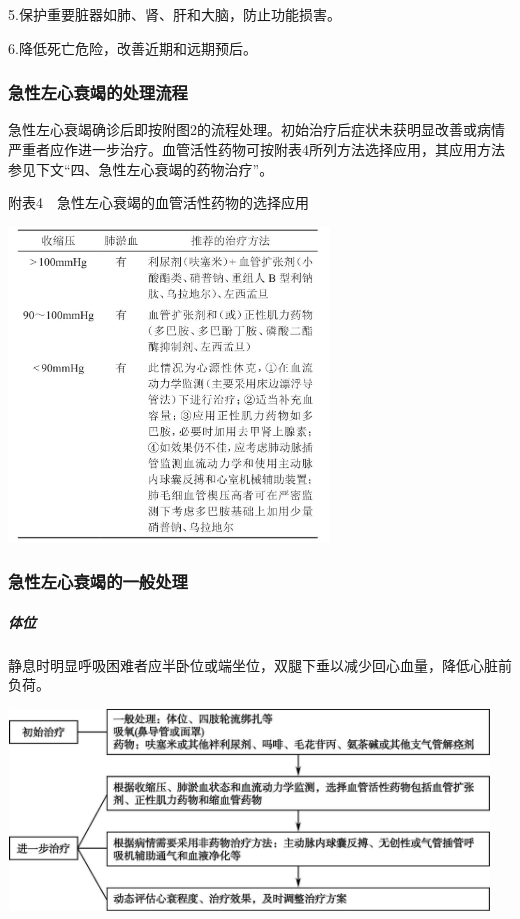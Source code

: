 5.保护重要脏器如肺、肾、肝和大脑，防止功能损害。

6.降低死亡危险，改善近期和远期预后。

\subsubsection{急性左心衰竭的处理流程}

急性左心衰竭确诊后即按附图2的流程处理。初始治疗后症状未获明显改善或病情严重者应作进一步治疗。血管活性药物可按附表4所列方法选择应用，其应用方法参见下文“四、急性左心衰竭的药物治疗”。

附表4　急性左心衰竭的血管活性药物的选择应用

\includegraphics[width=3.35417in,height=3.29167in]{./images/Image00110.jpg}

\subsubsection{急性左心衰竭的一般处理}

\subparagraph{体位}

静息时明显呼吸困难者应半卧位或端坐位，双腿下垂以减少回心血量，降低心脏前负荷。

\includegraphics[width=5.03125in,height=2.10417in]{./images/Image00111.jpg}

